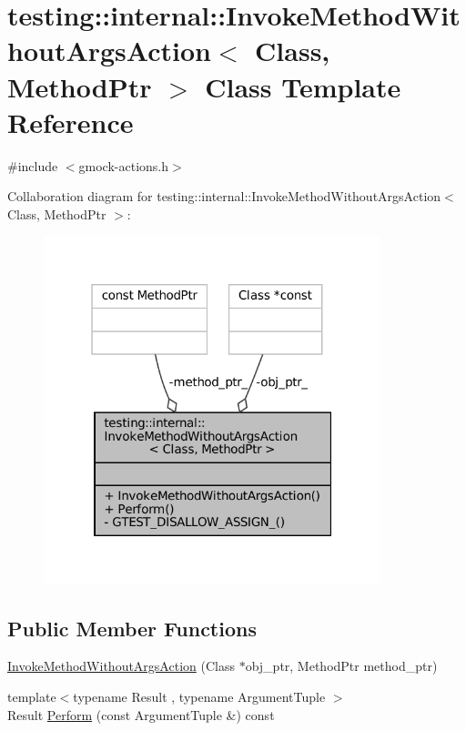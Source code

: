 \hypertarget{classtesting_1_1internal_1_1InvokeMethodWithoutArgsAction}{}\section{testing\+:\+:internal\+:\+:Invoke\+Method\+Without\+Args\+Action$<$ Class, Method\+Ptr $>$ Class Template Reference}
\label{classtesting_1_1internal_1_1InvokeMethodWithoutArgsAction}


{\ttfamily \#include $<$gmock-\/actions.\+h$>$}



Collaboration diagram for testing\+:\+:internal\+:\+:Invoke\+Method\+Without\+Args\+Action$<$ Class, Method\+Ptr $>$\+:
\nopagebreak
\begin{figure}[H]
\begin{center}
\leavevmode
\includegraphics[width=277pt]{classtesting_1_1internal_1_1InvokeMethodWithoutArgsAction__coll__graph}
\end{center}
\end{figure}
\subsection*{Public Member Functions}
\begin{DoxyCompactItemize}
\item 
\hyperlink{classtesting_1_1internal_1_1InvokeMethodWithoutArgsAction_ac4d655e386f47a96c7a6e1670b20e991}{Invoke\+Method\+Without\+Args\+Action} (Class $\ast$obj\+\_\+ptr, Method\+Ptr method\+\_\+ptr)
\item 
{\footnotesize template$<$typename Result , typename Argument\+Tuple $>$ }\\Result \hyperlink{classtesting_1_1internal_1_1InvokeMethodWithoutArgsAction_a9915e4f7a064e00b7798216644670b52}{Perform} (const Argument\+Tuple \&) const
\end{DoxyCompactItemize}
